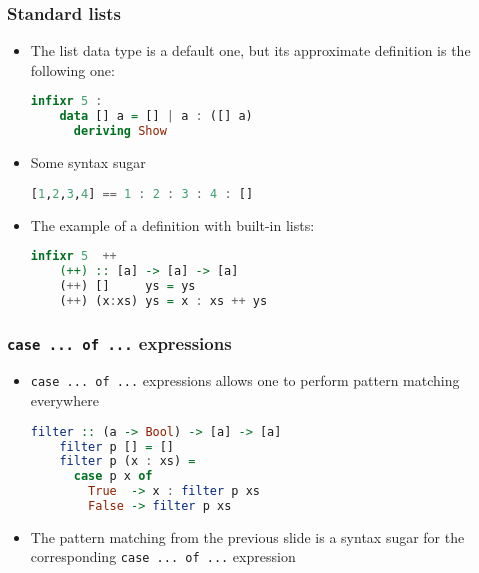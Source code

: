 \documentclass[10pt,pdf,utf8,russian,aspectratio=169]{beamer}
\begin{document}
\begin{frame}[fragile]
  \frametitle{Standard lists}

  \begin{itemize}
    \item The list data type is a default one, but its approximate definition is the following one:
    \begin{lstlisting}[language=Haskell]
    infixr 5 :
    data [] a = [] | a : ([] a)
      deriving Show
    \end{lstlisting}
    \item Some syntax sugar
    \begin{lstlisting}[language=Haskell]
    [1,2,3,4] == 1 : 2 : 3 : 4 : []
    \end{lstlisting}
    \item The example of a definition with built-in lists:
    \begin{lstlisting}[language=Haskell]
    infixr 5  ++
    (++) :: [a] -> [a] -> [a]
    (++) []     ys = ys
    (++) (x:xs) ys = x : xs ++ ys
    \end{lstlisting}
  \end{itemize}
\end{frame}

\begin{frame}[fragile]
  \frametitle{\verb"case ... of ..." expressions}
  \begin{itemize}
    \item \verb"case ... of ..." expressions allows one to perform pattern matching everywhere
    \begin{lstlisting}[language=Haskell]
    filter :: (a -> Bool) -> [a] -> [a]
    filter p [] = []
    filter p (x : xs) =
      case p x of
        True  -> x : filter p xs
        False -> filter p xs
    \end{lstlisting}
    \item The pattern matching from the previous slide is a syntax sugar for the corresponding \verb"case ... of ..." expression
  \end{itemize}
\end{frame}
\end{document}
